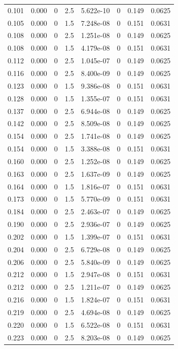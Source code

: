 \documentclass[preview]{standalone}
\begin{document}
{{\begin{tabular}{L{1.2cm}C{1.2cm} C{0.3cm}C{0.5cm} C{1.4cm}C{1.4cm} C{1.4cm}C{1.4cm}}
  0.101  &  0.000  & 0     & 2.5 &  5.622e-10  & 0  & 0.149 &  0.0625   \\ 
  0.105  &  0.000  & 0     & 1.5 &  7.248e-08  & 0  & 0.151 &  0.0631   \\ 
  0.108  &  0.000  & 0     & 2.5 &  1.251e-08  & 0  & 0.149 &  0.0625   \\ 
  0.108  &  0.000  & 0     & 1.5 &  4.179e-08  & 0  & 0.151 &  0.0631   \\ 
  0.112  &  0.000  & 0     & 2.5 &  1.045e-07  & 0  & 0.149 &  0.0625   \\ 
  0.116  &  0.000  & 0     & 2.5 &  8.400e-09  & 0  & 0.149 &  0.0625   \\ 
  0.123  &  0.000  & 0     & 1.5 &  9.386e-08  & 0  & 0.151 &  0.0631   \\ 
  0.128  &  0.000  & 0     & 1.5 &  1.355e-07  & 0  & 0.151 &  0.0631   \\ 
  0.137  &  0.000  & 0     & 2.5 &  6.944e-08  & 0  & 0.149 &  0.0625   \\ 
  0.142  &  0.000  & 0     & 2.5 &  8.509e-08  & 0  & 0.149 &  0.0625   \\ 
  0.154  &  0.000  & 0     & 2.5 &  1.741e-08  & 0  & 0.149 &  0.0625   \\ 
  0.154  &  0.000  & 0     & 1.5 &  3.388e-08  & 0  & 0.151 &  0.0631   \\ 
  0.160  &  0.000  & 0     & 2.5 &  1.252e-08  & 0  & 0.149 &  0.0625   \\ 
  0.163  &  0.000  & 0     & 2.5 &  1.637e-09  & 0  & 0.149 &  0.0625   \\ 
  0.164  &  0.000  & 0     & 1.5 &  1.816e-07  & 0  & 0.151 &  0.0631   \\ 
  0.173  &  0.000  & 0     & 1.5 &  5.770e-09  & 0  & 0.151 &  0.0631   \\ 
  0.184  &  0.000  & 0     & 2.5 &  2.463e-07  & 0  & 0.149 &  0.0625   \\ 
  0.190  &  0.000  & 0     & 2.5 &  2.936e-07  & 0  & 0.149 &  0.0625   \\ 
  0.202  &  0.000  & 0     & 1.5 &  1.399e-07  & 0  & 0.151 &  0.0631   \\ 
  0.204  &  0.000  & 0     & 2.5 &  6.729e-08  & 0  & 0.149 &  0.0625   \\ 
  0.206  &  0.000  & 0     & 2.5 &  5.840e-09  & 0  & 0.149 &  0.0625   \\ 
  0.212  &  0.000  & 0     & 1.5 &  2.947e-08  & 0  & 0.151 &  0.0631   \\ 
  0.212  &  0.000  & 0     & 2.5 &  1.211e-07  & 0  & 0.149 &  0.0625   \\ 
  0.216  &  0.000  & 0     & 1.5 &  1.824e-07  & 0  & 0.151 &  0.0631   \\ 
  0.219  &  0.000  & 0     & 2.5 &  4.694e-08  & 0  & 0.149 &  0.0625   \\ 
  0.220  &  0.000  & 0     & 1.5 &  6.522e-08  & 0  & 0.151 &  0.0631   \\ 
  0.223  &  0.000  & 0     & 2.5 &  8.203e-08  & 0  & 0.149 &  0.0625   \\ 
\hline 
\end{tabular} 

}}
\end{document}
